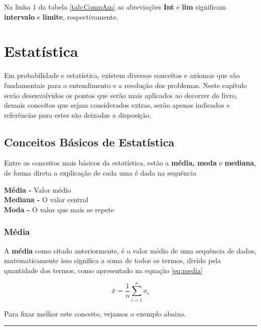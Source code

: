 \documentclass[
]{book}
\begin{document}
Na linha 1 da tabela \ref{tab:CompAm} as abreviações \textbf{Int} e \textbf{lim} significam \textbf{intervalo} e \textbf{limite}, respectivamente.

\hypertarget{estatuxedstica}{%
\chapter{Estatística}\label{estatuxedstica}}

Em probabilidade e estatística, existem diversos conceitos e axiomas que são fundamentais para o entendimento e a resolução dos problemas. Neste capítulo serão desenvolvidos os pontos que serão mais aplicados ao decorrer do livro, demais conceitos que sejam considerados extras, serão apenas indicados e referências para estes são deixadas a disposição.

\hypertarget{conceitos-buxe1sicos-de-estatuxedstica}{%
\section{Conceitos Básicos de Estatística}\label{conceitos-buxe1sicos-de-estatuxedstica}}

Entre os conceitos mais básicos da estatística, estão a \textbf{média, moda} e \textbf{mediana}, de forma direta a explicação de cada uma é dada na sequência

\textbf{Média -} Valor médio\\
\textbf{Mediana -} O valor central\\
\textbf{Moda -} O valor que mais se repete

\hypertarget{muxe9dia}{%
\subsection{Média}\label{muxe9dia}}

A \textbf{média} como citado anteriormente, é o valor médio de uma sequência de dados, matematicamente isso significa a soma de todos os termos, divido pela quantidade dos termos, como apresentado na equação \eqref{eq:media}

\begin{equation}
  \bar{x} = \frac{1}{n} \sum_{i=1}^n x_i
  \label{eq:media}
\end{equation}

Para fixar melhor este conceito, vejamos o exemplo abaixo.

\begin{center}\rule{0.5\linewidth}{0.5pt}\end{center}
\end{document}
